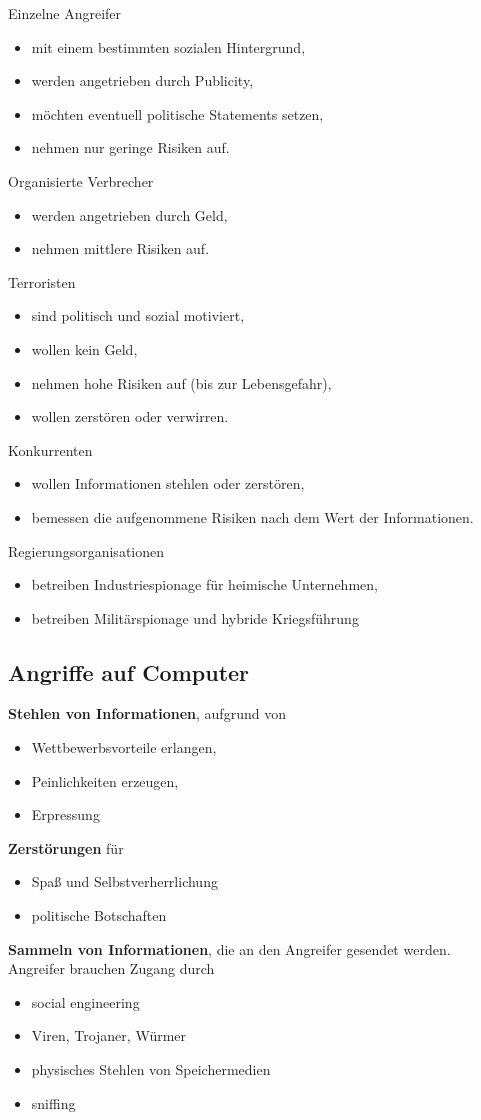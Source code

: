 Einzelne Angreifer
\begin{itemize}
  \item mit einem bestimmten sozialen Hintergrund,
  \item werden angetrieben durch Publicity,
  \item möchten eventuell politische Statements setzen,
  \item nehmen nur geringe Risiken auf.
\end{itemize}
Organisierte Verbrecher
\begin{itemize}
  \item werden angetrieben durch Geld,
  \item nehmen mittlere Risiken auf.
\end{itemize}
Terroristen
\begin{itemize}
  \item sind politisch und sozial motiviert,
  \item wollen kein Geld,
  \item nehmen hohe Risiken auf (bis zur Lebensgefahr),
  \item wollen zerstören oder verwirren.
\end{itemize}
Konkurrenten
\begin{itemize}
  \item wollen Informationen stehlen oder zerstören,
  \item bemessen die aufgenommene Risiken nach dem Wert der Informationen.
\end{itemize}
Regierungsorganisationen
\begin{itemize}
  \item betreiben Industriespionage für heimische Unternehmen,
  \item betreiben Militärspionage und hybride Kriegsführung
\end{itemize}

\subsection{Angriffe auf Computer}%
\label{sub:angriffe_auf_computer}

\textbf{Stehlen von Informationen}, aufgrund von
\begin{itemize}
  \item Wettbewerbsvorteile erlangen,
  \item Peinlichkeiten erzeugen,
  \item Erpressung
\end{itemize}
\textbf{Zerstörungen} für
\begin{itemize}
  \item Spaß und Selbstverherrlichung
  \item politische Botschaften
\end{itemize}
\textbf{Sammeln von Informationen}, die an den Angreifer gesendet werden.
Angreifer brauchen Zugang durch
\begin{itemize}
  \item social engineering
  \item Viren, Trojaner, Würmer
  \item physisches Stehlen von Speichermedien
  \item sniffing
\end{itemize}

